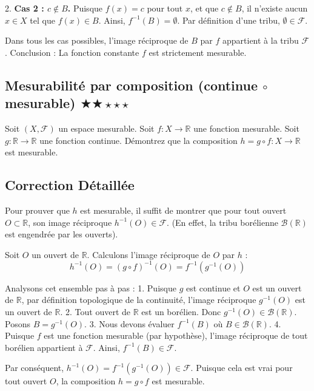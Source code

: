 \documentclass[11pt,a4paper]{article}
\begin{document}
2. \textbf{Cas 2 : $c \notin B$.}
   Puisque $f(x) = c$ pour tout $x$, et que $c \notin B$, il n'existe aucun $x \in X$ tel que $f(x) \in B$.
   Ainsi, $f^{-1}(B) = \emptyset$.
   Par définition d'une tribu, $\emptyset \in \mathcal{F}$.

Dans tous les cas possibles, l'image réciproque de $B$ par $f$ appartient à la tribu $\mathcal{F}$.
Conclusion : La fonction constante $f$ est strictement mesurable.


\vspace{0.5cm}

\subsection*{Mesurabilité par composition (continue $\circ$ mesurable) \quad $\bigstar\bigstar\star\star\star$}

Soit $(X, \mathcal{F})$ un espace mesurable. Soit $f : X \to \mathbb{R}$ une fonction mesurable. Soit $g : \mathbb{R} \to \mathbb{R}$ une fonction continue.
Démontrez que la composition $h = g \circ f : X \to \mathbb{R}$ est mesurable.

\subsection*{Correction Détaillée}

Pour prouver que $h$ est mesurable, il suffit de montrer que pour tout ouvert $O \subset \mathbb{R}$, son image réciproque $h^{-1}(O) \in \mathcal{F}$. (En effet, la tribu borélienne $\mathcal{B}(\mathbb{R})$ est engendrée par les ouverts).

Soit $O$ un ouvert de $\mathbb{R}$.
Calculons l'image réciproque de $O$ par $h$ :
$$ h^{-1}(O) = (g \circ f)^{-1}(O) = f^{-1}(g^{-1}(O)) $$

Analysons cet ensemble pas à pas :
1. Puisque $g$ est continue et $O$ est un ouvert de $\mathbb{R}$, par définition topologique de la continuité, l'image réciproque $g^{-1}(O)$ est un ouvert de $\mathbb{R}$.
2. Tout ouvert de $\mathbb{R}$ est un borélien. Donc $g^{-1}(O) \in \mathcal{B}(\mathbb{R})$. Posons $B = g^{-1}(O)$.
3. Nous devons évaluer $f^{-1}(B)$ où $B \in \mathcal{B}(\mathbb{R})$.
4. Puisque $f$ est une fonction mesurable (par hypothèse), l'image réciproque de tout borélien appartient à $\mathcal{F}$. Ainsi, $f^{-1}(B) \in \mathcal{F}$.

Par conséquent, $h^{-1}(O) = f^{-1}(g^{-1}(O)) \in \mathcal{F}$.
Puisque cela est vrai pour tout ouvert $O$, la composition $h = g \circ f$ est mesurable.
\end{document}
